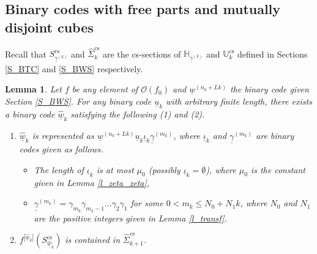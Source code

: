\documentclass{amsart}
\newtheorem{lem}[thm]{Lemma}
\theoremstyle{definition}
\numberwithin{equation}{section}
\numberwithin{figure}{section}
\begin{document}
\subsection{Binary codes with free parts and mutually disjoint cubes}\label{ss_binary_free}
Recall that 
$S_{\underline{\gamma}^{(k)}}^{\mathrm{cs}}$
and $\widehat{\Sigma}_{k}^{\mathrm{cs}}$
are the cs-sections of 
$\mathbb{H}_{\underline{\gamma}^{(k)}}$
and $\mathbb{U}_{k}^{\mathrm{cs}}$
defined in Sections \ref{S_BTC} and \ref{S_BWS} respectively.


\begin{lem}\label{lem-3-1}
Let $f$ be any element of $\mathcal{O}(f_0)$ and 
$\underline{w}^{(n_0+Lk)}$ the binary code given Section \ref{S_BWS}.
For any binary code $\underline{u}_k$ with arbitrary finite length, 
there exists a binary code $\underline{\widehat w}_k$ 
satisfying the following {\rm (1)} and {\rm (2)}.
\begin{enumerate}[\rm (1)]
\item\label{lem-3-1(1)}
$\underline{\widehat w}_k$ 
is represented as $\underline{w}^{(n_0+Lk)}\underline{u}_k\underline{\iota}_k\underline{\gamma}^{(m_k)}$, 
where 
$\underline{\iota}_k$ and $\underline{\gamma}^{(m_k)}$ are binary codes given as follows. 
\begin{itemize}
\item
The length of $\underline{\iota}_k$ is at most $\mu_0$ (possibly $\underline{\iota}_k=\emptyset$), where 
$\mu_0$ is the constant given in Lemma \ref{l_zeta_zeta}, 
\item
$\underline{\gamma}^{(m_k)}=\gamma_{m_k}\gamma_{m_k-1}\dots \gamma_2\gamma_1$ 
for some $0<m_k\leq N_0+N_1k$, where $N_0$ and $N_1$ are the positive integers given in Lemma \ref{l_transf}.
\end{itemize}
\item \label{lem-3-1(2)}
$f^{|\widehat{\underline{w}}_k|}(S_{\widehat{\underline{w}}_k}^{\mathrm{cs}})$ is contained in $\widehat{\Sigma}_{k+1}^{\mathrm{cs}}$.
\end{enumerate}
\end{lem}
\end{document}
